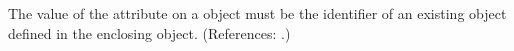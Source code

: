 The value of the attribute  on a \Species object
must be the identifier of an existing \Parameter object defined in the
enclosing \Model object.  (References: .)
